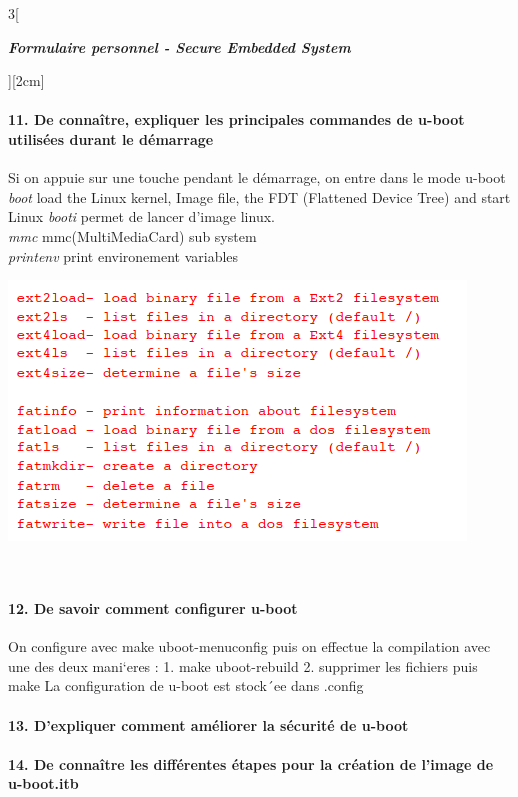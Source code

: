 \begin{multicols}{3}[\centerline{ \large\em \textbf{Formulaire personnel - Secure Embedded System}}][2cm]
\paragraph*{11. De connaître, expliquer les principales commandes de u-boot utilisées durant le démarrage\\}
Si on appuie sur une touche pendant le démarrage, on entre dans le mode u-boot\\
\textit{boot} load the Linux kernel, Image file, the FDT (Flattened Device Tree) and start Linux
\textit{booti} permet de lancer d'image linux.\\
\textit{mmc} mmc(MultiMediaCard) sub system\\
\textit{printenv} print environement variables\\
\begin{minipage}{\linewidth}
	\centering
    \includegraphics[width =0.8\columnwidth]{images/9.png}
\end{minipage}\\
\paragraph*{12. De savoir comment configurer u-boot\\}
On configure avec make uboot-menuconfig puis on effectue la compilation avec une des deux mani`eres :
1. make uboot-rebuild
2. supprimer les fichiers puis make
La configuration de u-boot est stock´ee dans .config
\paragraph*{13. D’expliquer comment améliorer la sécurité de u-boot\\}
\paragraph*{14. De connaître les différentes étapes pour la création de l’image de u-boot.itb\\}

\end{multicols}

